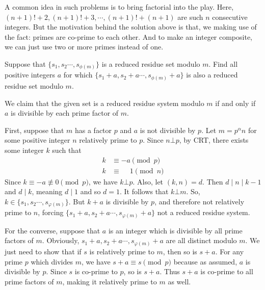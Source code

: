 	\begin{note}
		A common idea in such problems is to bring factorial into the play. Here, $(n+1)!+2,(n+1)!+3,\cdots,(n+1)!+(n+1)$ are such $n$ consecutive integers. But the motivation behind the solution above is that, we making use of the fact: primes are co-prime to each other. And to make an integer composite, we can just use two or more primes instead of one.
	\end{note}

	\begin{problem}
		Suppose that $ \{s_1,s_2\cdots , s_{\phi(m)}\} $ is a reduced residue set modulo $m$. Find all positive integers $a$ for which $ \{s_1+a,s_2+a\cdots , s_{\phi(m)}+a\} $ is also a reduced residue set modulo $m$.
	\end{problem}

	\begin{solution}
		We claim that the given set is a reduced residue system modulo $m$ if and only if $a$ is divisible by each prime factor of $m$.

		First, suppose that $m$ has a factor $p$ and $a$ is not divisible by $p$. Let $m=p^{\alpha}n$ for some positive integer $n$ relatively prime to $p$. Since $n \bot p$, by CRT, there exists some integer $k$ such that
			\begin{align*}
				k &\equiv -a \pmod p\\
				k &\equiv \phantom{-}1  \pmod n
			\end{align*}
		Since $k \equiv -a \not \equiv 0 \pmod p$, we have $k \bot p$. Also, let $(k,n)=d$. Then $d\mid n\mid k-1$ and $d\mid k$, meaning $d\mid 1$ and so $d=1$. It follows that $k \bot m$. So, $k \in \{s_1,s_2\cdots , s_{\varphi(m)}\} $. But $k+a$ is divisible by $p$, and therefore not relatively prime to $n$, forcing $ \{s_1+a,s_2+a\cdots , s_{\varphi(m)}+a\} $ not a reduced residue system.

		For the converse, suppose that $a$ is an integer which is divisible by all prime factors of $m$. Obviously, $s_1+a,s_2+a\cdots , s_{\varphi(m)}+a$ are all distinct modulo $m$. We just need to show that if $s$ is relatively prime to $m$, then so is $s+a$. For any prime $p$ which divides $m$, we have $s+a \equiv s \pmod p$ because as assumed, $a$ is divisible by $p$. Since $s$ is co-prime to $p$, so is $s+a$. Thus $s+a$ is co-prime to all prime factors of $m$, making it relatively prime to $m$ as well.
	\end{solution}

